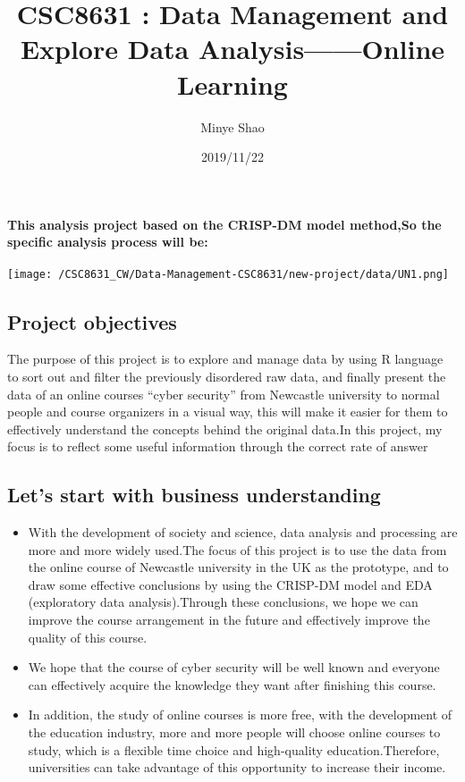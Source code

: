 \documentclass[]{article}
\title{CSC8631 : Data Management and Explore Data Analysis------Online Learning}
\author{Minye Shao}
\date{2019/11/22}
\let\oldparagraph\paragraph
\renewcommand{\paragraph}[1]{\oldparagraph{#1}\mbox{}}
\begin{document}
\maketitle

\hypertarget{this-analysis-project-based-on-the-crisp-dm-model-methodso-the-specific-analysis-process-will-be}{%
\paragraph{This analysis project based on the CRISP-DM model method,So
the specific analysis process will
be:}\label{this-analysis-project-based-on-the-crisp-dm-model-methodso-the-specific-analysis-process-will-be}}

\texttt{[image: /CSC8631\_CW/Data-Management-CSC8631/new-project/data/UN1.png]}

\hypertarget{project-objectives}{%
\subsection{Project objectives}\label{project-objectives}}

The purpose of this project is to explore and manage data by using R
language to sort out and filter the previously disordered raw data, and
finally present the data of an online courses ``cyber security'' from
Newcastle university to normal people and course organizers in a visual
way, this will make it easier for them to effectively understand the
concepts behind the original data.In this project, my focus is to
reflect some useful information through the correct rate of answer

\hypertarget{lets-start-with-business-understanding}{%
\subsection{Let's start with business
understanding}\label{lets-start-with-business-understanding}}

\begin{itemize}
\item
  With the development of society and science, data analysis and
  processing are more and more widely used.The focus of this project is
  to use the data from the online course of Newcastle university in the
  UK as the prototype, and to draw some effective conclusions by using
  the CRISP-DM model and EDA (exploratory data analysis).Through these
  conclusions, we hope we can improve the course arrangement in the
  future and effectively improve the quality of this course.
\item
  We hope that the course of cyber security will be well known and
  everyone can effectively acquire the knowledge they want after
  finishing this course.
\item
  In addition, the study of online courses is more free, with the
  development of the education industry, more and more people will
  choose online courses to study, which is a flexible time choice and
  high-quality education.Therefore, universities can take advantage of
  this opportunity to increase their income.
\end{itemize}
\end{document}
